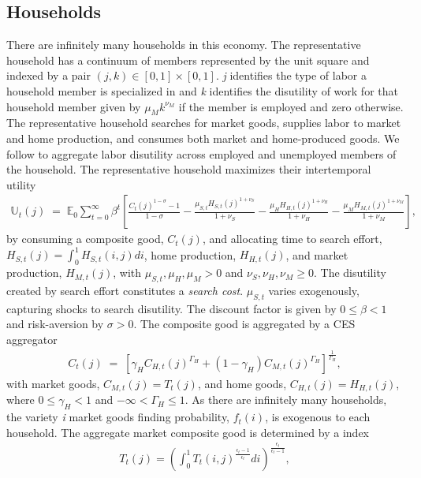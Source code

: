 \documentclass[12pt,3p,authoryear,review]{elsarticle}
\begin{document}
\subsection{Households}%
There are infinitely many households in this economy. The representative household has a continuum of members represented by the unit square and indexed by a pair $(j,k) \in [0,1] \times [0,1]$. \textit{j} identifies the type of labor a household member is specialized in and \textit{k} identifies the disutility of work for that household member given by $\mu_M k^{\nu_M}$ if the member is employed and zero otherwise. The representative household searches for market goods, supplies labor to market and home production, and consumes both market and home-produced goods. We follow \cite{gali2011unemployment} to aggregate labor disutility across employed and unemployed members of the household. The representative household maximizes their intertemporal utility
\begin{align*}%
 	\mathbb{U}_t(j) \; = \; \mathbb{E}_0 \sum_{t=0}^{\infty} \beta^t \left[ \frac{C_t(j)^{1-\sigma}-1}{1-\sigma} - \frac{\mu_{S,t} H_{S,t}(j)^{1+\nu_S}}{1+\nu_S} - \frac{\mu_H H_{H,t}(j)^{1+\nu_H}}{1+\nu_H} - \frac{\mu_M H_{M,t}(j)^{1+\nu_M}}{1+\nu_M} \right],%
\end{align*}%
by consuming a composite good, $C_t(j)$, and allocating time to search effort, $H_{S,t}(j) = \int_0^1 H_{S,t}(i,j) di$, home production, $H_{H,t}(j)$, and market production, $H_{M,t}(j)$, with $\mu_{S,t}, \mu_H, \mu_M > 0$ and $\nu_S, \nu_H, \nu_M \geq 0$. The disutility created by search effort constitutes a \emph{search cost}. $\mu_{S,t}$ varies exogenously, capturing shocks to search disutility. The discount factor is given by $0\leq\beta<1$ and risk-aversion by $\sigma>0$. The composite good is aggregated by a CES aggregator%
\begin{align}%
	C_t(j) \; = \; \left[ \gamma_H C_{H,t}(j)^{\Gamma_H} + \left(1-\gamma_H\right) C_{M,t}(j)^{\Gamma_H} \right]^{\frac{1}{\Gamma_H}},\label{eq:composite_consumption}
\end{align}%
with market goods, $C_{M,t}(j) = T_t(j)$, and home goods, $C_{H,t}(j) = H_{H,t}(j)$, where $0 \leq \gamma_H < 1$ and $-\infty < \Gamma_H \leq 1$. As there are infinitely many households, the variety \textit{i} market goods finding probability, $f_{t}(i)$, is exogenous to each household. The aggregate market composite good is determined by a \cite{dixitMonopolisticCompetitionOptimum1977} index%
\begin{align*}%
 	T_t(j) = \left( \int_0^1 T_t(i,j)^{\frac{\epsilon_t-1}{\epsilon_t}} di \right)^{\frac{\epsilon_t}{\epsilon_t-1}},%
\end{align*}%
\end{document}
